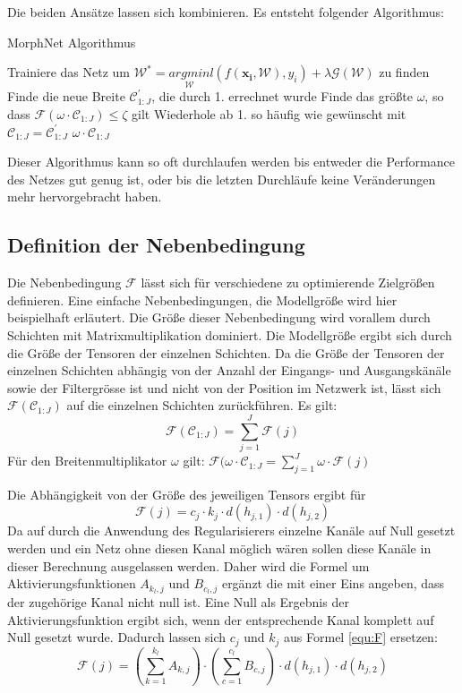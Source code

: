 Die beiden Ansätze lassen sich kombinieren. Es entsteht folgender Algorithmus:
\begin{algorithm}[H]
\caption{MorphNet Algorithmus}
\begin{algorithmic}[1]
\STATE Trainiere das Netz um $\mathcal{W}^{\ast}=\underset{\mathcal{W}}{arg min} l(f(\mathbf{x_i}, \mathcal{W}),y_i) + \lambda \mathcal{G}(\mathcal{W})$ zu finden
\STATE Finde die neue Breite $\mathcal{C}_{1:J}^{\prime}$, die durch 1. errechnet wurde
\STATE Finde das größte $\omega$, so dass $\mathcal{F}(\omega \cdot \mathcal{C}_{1:J})\leq \zeta$ gilt
\STATE Wiederhole ab 1. so häufig wie gewünscht mit $\mathcal{C}_{1:J} = \mathcal{C}_{1:J}^{\prime}$
\ENSURE $\omega \cdot \mathcal{C}_{1:J}$
\end{algorithmic}
\label{alg:morphnet}
\end{algorithm}
Dieser Algorithmus kann so oft durchlaufen werden bis entweder die Performance des Netzes gut genug ist, oder bis die letzten Durchläufe keine Veränderungen mehr hervorgebracht haben.


\subsection{Definition der Nebenbedingung}
Die Nebenbedingung $\mathcal{F}$ lässt sich für verschiedene zu optimierende Zielgrößen definieren. Eine einfache Nebenbedingungen, die Modellgröße wird hier beispielhaft erläutert. Die Größe dieser Nebenbedingung wird vorallem durch Schichten mit Matrixmultiplikation dominiert. Die Modellgröße ergibt sich durch die Größe der Tensoren der einzelnen Schichten. Da die Größe der Tensoren der einzelnen Schichten abhängig von der Anzahl der Eingangs- und Ausgangskänäle sowie der Filtergrösse ist und nicht von der Position im Netzwerk ist, lässt sich $\mathcal{F}(\mathcal{C}_{1:J})$ auf die einzelnen Schichten zurückführen. Es gilt:
\begin{equation}
 \mathcal{F}(\mathcal{C}_{1:J})=\sum_{j=1}^{J} \mathcal{F}(j)
\end{equation}
Für den Breitenmultiplikator $\omega$ gilt: $\mathcal{F}(\omega \cdot \mathcal{C}_{1:J}=\sum_{j=1}^{J} \omega \cdot \mathcal{F}(j)$

Die Abhängigkeit von der Größe des jeweiligen Tensors ergibt für 
\begin{equation}\label{equ:F}
\mathcal{F}(j)=c_j \cdot k_j \cdot d(h_{j,1}) \cdot d(h_{j,2})  
\end{equation}
Da auf durch die Anwendung des Regularisierers einzelne Kanäle auf Null gesetzt werden und ein Netz ohne diesen Kanal möglich wären sollen diese Kanäle in dieser Berechnung ausgelassen werden. Daher wird die Formel um Aktivierungsfunktionen $A_{k_l,j}$ und $B_{c_l,j}$ ergänzt die mit einer Eins angeben, dass der zugehörige Kanal nicht null ist. Eine Null als Ergebnis der Aktivierungsfunktion ergibt sich, wenn der entsprechende Kanal komplett auf Null gesetzt wurde. Dadurch lassen sich $c_j$ und $k_j $ aus Formel \ref{equ:F} ersetzen:
\begin{equation}
\mathcal{F}(j)=\left(\sum_{k=1}^{k_l} A_{k,j} \right) \cdot \left(\sum_{c=1}^{c_l} B_{c,j}\right) \cdot d(h_{j,1}) \cdot d(h_{j,2})  
\end{equation}


